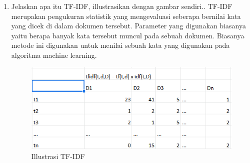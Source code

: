 \begin{enumerate}
    \item Jelaskan apa itu TF-IDF, illustrasikan dengan gambar sendiri..
    TF-IDF merupakan pengukuran statistik yang mengevaluasi seberapa bernilai kata yang dicek di dalam dokumen tersebut. Parameter yang digunakan biasanya yaitu berapa banyak kata tersebut muncul pada sebuah dokumen. Biasanya metode ini digunakan untuk menilai sebuah kata yang digunakan pada algoritma machine learning.
    \begin{figure}[ht]
        \centering
        \includegraphics[scale=0.2]{figures/1174035/chapter4/6_teori.png}
        \caption{Illustrasi TF-IDF}
        \label{contoh5}
    \end{figure}
\end{enumerate}

